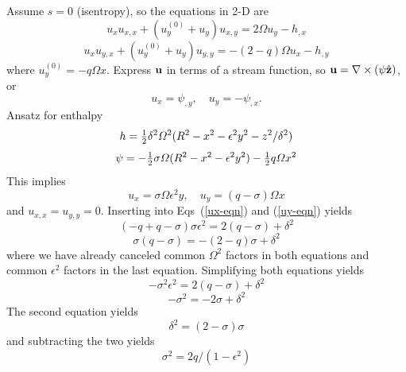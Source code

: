 \documentclass[\mydriver,12pt,twoside,notitlepage,a4paper]{article}
\newcommand{\curl}    {\nabla\times}
\begin{document}
Assume $s=0$ (isentropy), so the equations in 2-D are
\begin{equation}\label{ux-eqn}
  u_x u_{x,x} + (u_y^{(0)}+u_y) u_{x,y} = 2\varOmega u_y - h_{,x}
\end{equation}
\begin{equation}\label{uy-eqn}
  u_x u_{y,x} + (u_y^{(0)}+u_y) u_{y,y} = -(2-q)\varOmega u_x - h_{,y}
\end{equation}
where $u_y^{(0)}=-q\varOmega x$.
Express ${\bf u}$ in terms of a stream function, so
${\bf u}=\curl(\psi\hat{\bf z})$, or
\begin{equation}\label{u-streamfunction}
  u_x = \psi_{,y},\quad u_y = -\psi_{,x}.
\end{equation}
Ansatz for enthalpy
\begin{equation}\label{u-ansatz}
  h={\textstyle{1\over2}}\delta^2\varOmega^2(R^2- x^2 - \epsilon^2 y^2
  - z^2/\delta^2)
\end{equation}
\begin{equation}\label{u-ansatz2}
  \psi=-{\textstyle{1\over2}}\sigma\varOmega(R^2- x^2 - \epsilon^2 y^2)
       -{\textstyle{1\over2}}q\varOmega x^2
\end{equation}
This implies
\begin{equation}\label{u-streamfunction2}
  u_x = \sigma\varOmega\epsilon^2 y,\quad u_y = (q-\sigma)\varOmega x
\end{equation}
and $u_{x,x}=u_{y,y}=0$.
Inserting into Eqs~(\ref{ux-eqn}) and (\ref{uy-eqn}) yields
\begin{equation}\label{ux-eqn-insert1}
  (-q+q-\sigma)\sigma\epsilon^2 = 2(q-\sigma)+\delta^2
\end{equation}
\begin{equation}\label{uy-eqn-insert1}
  \sigma(q-\sigma) = -(2-q)\sigma+\delta^2
\end{equation}
where we have already canceled common $\varOmega^2$ factors in both equations
and common $\epsilon^2$ factors in the last equation.
Simplifying both equations yields
\begin{equation}\label{ux-eqn-insert2}
  -\sigma^2\epsilon^2 = 2(q-\sigma)+\delta^2
\end{equation}
\begin{equation}\label{uy-eqn-insert2}
  -\sigma^2 = -2\sigma+\delta^2
\end{equation}
The second equation yields
\begin{equation}\label{ux-eqn-elim1}
  \delta^2=(2-\sigma)\sigma
\end{equation}
and subtracting the two yields
\begin{equation}\label{ux-eqn-elim2}
  \sigma^2=2q/(1-\epsilon^2)
\end{equation}
\end{document}
